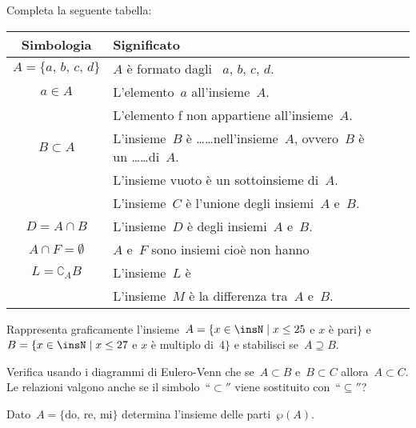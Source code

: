 \begin{esercizio}
Completa la seguente tabella:

\begin{tabular*}{.9\textwidth}{@{\extracolsep{\fill}}*{2}{cl}}
\toprule
Simbologia & Significato\\
\midrule
$A=\{a\text{, }b\text{, }c\text{, }d\}$ & $A$ è formato dagli \dotfill~$a\text{, }b\text{, }c\text{, }d$.\\
$a\in A$ & L'elemento~$a$ \dotfill all'insieme~$A$.\\
\dotfill & L'elemento f non appartiene all'insieme~$A$.\\
$B\subset A$ & L'insieme~$B$ è \ldots\ldots nell'insieme~$A$, ovvero~$B$ è un \ldots\ldots di~$A$.\\
\dotfill & L'insieme vuoto è un sottoinsieme di~$A$.\\
\dotfill & L'insieme~$C$ è l'unione degli insiemi~$A$ e~$B$.\\
$D=A\cap B$ & L'insieme~$D$ è \dotfill degli insiemi~$A$ e~$B$.\\
$A\cap F=\emptyset $& $A$ e~$F$ sono insiemi \dotfill cioè non hanno \dotfill \\
$L=\complement_{A}B$ & L'insieme~$L$ è \dotfill \\
\dotfill & L'insieme~$M$ è la differenza tra~$A$ e~$B$.\\
\bottomrule
\end{tabular*}
\end{esercizio}

\begin{esercizio}
Rappresenta graficamente l'insieme~$A=\{x\in\insN\mid x\le 25$ e $x$ è pari$\}$ e
$B=\{x\in\insN\mid x\le 27$ e $x$ è multiplo di~4$\}$ e stabilisci se~$A\supseteq B$.
\end{esercizio}

\begin{esercizio}
Verifica usando i diagrammi di Eulero-Venn che se~$A\subset B$ e~$B\subset C$ allora~$A\subset C$. Le relazioni valgono
anche se il simbolo~``${\subset}''$ viene sostituito con~``${\subseteq}''$?
\end{esercizio}

\begin{esercizio}
Dato~$A=\{\text{do, re, mi}\}$ determina l'insieme delle parti~$\wp (A)$.
\end{esercizio}

